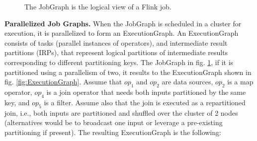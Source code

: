 \documentclass{sig-alternate}
\begin{document}
\begin{figure}[ht]
\centering
{}
\label{fig:JobGraph}
\caption{The JobGraph is the logical view of a Flink job.}
\end{figure}

\textbf{Parallelized Job Graphs.} When the JobGraph is scheduled in a cluster for execution, it is parallelized to form an ExecutionGraph. An ExecutionGraph consists of tasks (parallel instances of operators), and intermediate result partitions (IRPs), that represent logical partitions of intermediate results corresponding to different partitioning keys. The JobGraph in fig. \ref{fig:JobGraph}, if it is partitioned using a parallelism of two, it results to the ExecutionGraph shown in fig. \ref{fig:ExecutionGraph}. Assume that $op_1$ and $op_2$ are data sources, $op_2$ is a map operator, $op_4$ is a join operator that needs both inputs partitioned by the same key, and $op_5$ is a filter. Assume also that the join is executed as a repartitioned join, i.e., both inputs are partitioned and shuffled over the cluster of 2 nodes (alternatives would be to broadcast one input or leverage a pre-existing partitioning if present). The resulting ExecutionGraph is the following:
\end{document}
